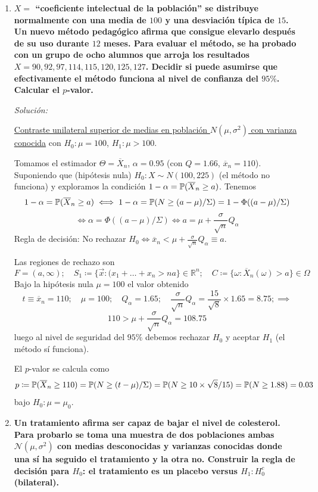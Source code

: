 \begin{enumerate}
  \item \textbf{$X =$ ``coeficiente intelectual de la población'' se distribuye normalmente con una media de $100$ y una desviación típica de $15$. Un nuevo método pedagógico afirma que consigue elevarlo después de su uso durante $12$ meses. Para evaluar el método, se ha probado con un grupo de ocho alumnos que arroja los resultados $X = 90, 92, 97, 114, 115, 120, 125, 127$. Decidir si puede asumirse que efectivamente el método funciona al nivel de confianza del $95\%$. Calcular el $p$-valor.}

  \smallskip
  \noindent\emph{Solución:}
  
  \noindent\underline{Contraste unilateral superior de medias en población $N(\mu, \sigma^2)$ con varianza conocida} con $H_0 : \mu = 100$, $H_1 : \mu > 100$.

  Tomamos el estimador $\Theta = \overline{X}_n$, $\alpha = 0.95$ (con $Q = 1.66$, $\overline{x}_n = 110$). Suponiendo que (hipótesis nula) $H_0 : X \sim N(100, 225)$ (el método no funciona) y exploramos la condición $1 - \alpha = \mathbb{P}(\overline{X}_n \geq a)$. Tenemos
  \[
    1 - \alpha = \mathbb{P}(\overline{X}_n \geq a) \iff 1 - \alpha = \mathbb{P}(N \geq (a - \mu)/\Sigma) = 1 - \Phi((a - \mu)/\Sigma)
  \]
  \[
    \iff \alpha = \Phi((a - \mu)/\Sigma) \iff a = \mu + \frac{\sigma}{\sqrt{n}} Q_\alpha
  \]
  Regla de decisión: No rechazar $H_0 \iff \overline{x}_n < \mu + \frac{\sigma}{\sqrt{n}} Q_\alpha \equiv a$.

  Las regiones de rechazo son
  \[
    F = (a, \infty); \quad S_1 \coloneqq \{\vec{x} : (x_1 + \dots + x_n > na\} \in \mathbb{R}^n; \quad C \coloneqq \{\omega : \overline{X}_n(\omega) > a\} \in \Omega
  \]
  Bajo la hipótesis nula $\mu = 100$ el valor obtenido
  \[
    t \equiv \overline{x}_n = 110; \quad \mu = 100; \quad Q_\alpha = 1.65; \quad \frac{\sigma}{\sqrt{n}} Q_\alpha = \frac{15}{\sqrt{8}} \times 1.65 = 8.75; \implies
  \]
  \[
    110 > \mu + \frac{\sigma}{\sqrt{n}} Q_\alpha = 108.75
  \]
  luego al nivel de seguridad del $95\%$ debemos rechazar $H_0$ y aceptar $H_1$ (el método sí funciona).

  El $p$-valor se calcula como
  \[
    p \coloneqq \mathbb{P}(\overline{X}_n \geq 110) = \mathbb{P}(N \geq (t - \mu)/\Sigma) = \mathbb{P}(N \geq 10 \times \sqrt{8}/15) = \mathbb{P}(N \geq 1.88) = 0.03
  \]
  bajo $H_0 : \mu = \mu_0$.

  \item \textbf{Un tratamiento afirma ser capaz de bajar el nivel de colesterol. Para probarlo se toma una muestra de dos poblaciones ambas $\mathcal{N}(\mu, \sigma^2)$ con medias desconocidas y varianzas conocidas donde una sí ha seguido el tratamiento y la otra no. Construir la regla de decisión para $H_0$: el tratamiento es un placebo versus $H_1 : H_0^c$ (bilateral).}


\end{enumerate}
